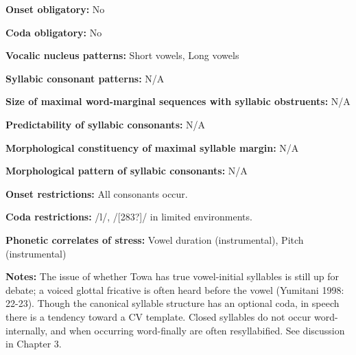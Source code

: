 \begin{styleBody}
\textbf{Onset obligatory:} No
\end{styleBody}

\begin{styleBody}
\textbf{Coda obligatory:} No
\end{styleBody}

\begin{styleBody}
\textbf{Vocalic nucleus patterns:} Short vowels, Long vowels
\end{styleBody}

\begin{styleBody}
\textbf{Syllabic consonant patterns:} N/A
\end{styleBody}

\begin{styleBody}
\textbf{Size of maximal word{}-marginal sequences with syllabic obstruents:} N/A
\end{styleBody}

\begin{styleBody}
\textbf{Predictability of syllabic consonants:} N/A
\end{styleBody}

\begin{styleBody}
\textbf{Morphological constituency of maximal syllable margin:} N/A
\end{styleBody}

\begin{styleBody}
\textbf{Morphological pattern of syllabic consonants:} N/A
\end{styleBody}

\begin{styleBody}
\textbf{Onset restrictions: }All consonants occur.
\end{styleBody}

\begin{styleBody}
\textbf{Coda restrictions: }/l/, /[283?]/ in limited environments.
\end{styleBody}

\begin{styleBody}
\textbf{Phonetic correlates of stress: }Vowel duration (instrumental), Pitch (instrumental)
\end{styleBody}

\begin{styleBody}
\textbf{Notes:} The issue of whether Towa has true vowel-initial syllables is still up for debate; a voiced glottal fricative is often heard before the vowel (Yumitani 1998: 22-23). Though the canonical syllable structure has an optional coda, in speech there is a tendency toward a CV template. Closed syllables do not occur word-internally, and when occurring word-finally are often resyllabified. See discussion in Chapter 3.
\end{styleBody}

